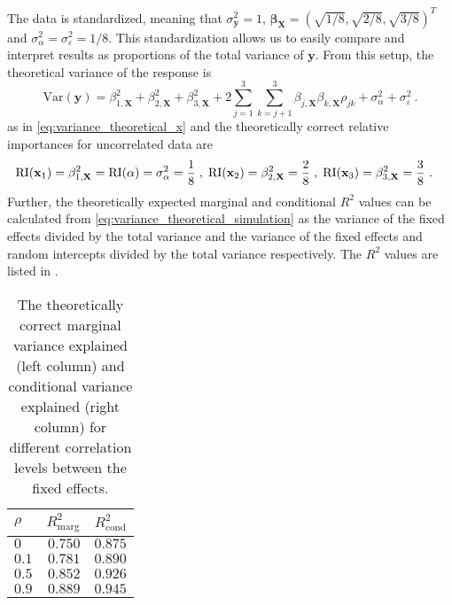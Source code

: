 The data is standardized, meaning that $\sigma^2_{\mathbf{y}}=1$, $\boldsymbol{\beta}_{\mathbf{X}}=(\sqrt{1/8}, \sqrt{2/8}, \sqrt{3/8})^T$ and $\sigma^2_{\alpha}=\sigma^2_{\varepsilon} = 1/8$.
This standardization allows us to easily compare and interpret results as proportions of the total variance of $\mathbf{y}$.
\newline
\newline
From this setup, the theoretical variance of the response is
\begin{equation}
    \label{eq:variance_theoretical_simulation}
    \text{Var}(\mathbf{y}) = \beta_{1, \mathbf{X}}^2 + \beta_{2, \mathbf{X}}^2 + \beta_{3, \mathbf{X}}^2 + 2\sum_{j=1}^{3}\sum_{k=j+1}^{3} \beta_{j, \mathbf{X}}\beta_{k, \mathbf{X}}\rho_{jk} + \sigma_{\alpha}^2 + \sigma^2_{\varepsilon} \ .
\end{equation}
as in \eqref{eq:variance_theoretical_x} and the theoretically correct relative importances for uncorrelated data are
\begin{equation}
    \begin{aligned}
        \text{RI}(\mathbf{x}_1) =  \beta_{1, \mathbf{X}}^2& = \text{RI}(\alpha) = \sigma^2_{\alpha} = \frac{1}{8} \hspace{1mm}, \hspace{1mm} \text{RI}(\mathbf{x}_2) = \beta_{2, \mathbf{X}}^2 = \frac{2}{8} \hspace{1mm}, \hspace{1mm} \text{RI}(\mathbf{x}_3) = \beta_{3, \mathbf{X}}^2 = \frac{3}{8} \ . 
    \end{aligned}
\end{equation}
Further, the theoretically expected marginal and conditional $R^2$ values can be calculated from \ref{eq:variance_theoretical_simulation} as the variance of the fixed effects divided by the total variance and the variance of the fixed effects and random intercepts divided by the total variance respectively. 
The $R^2$ values are listed in .
\begin{table}[ht]
    \centering
    \begin{tabular}{lrr}
    \hline
    $\rho$ & $R^2_{\text{marg}}$ & $R^2_{\text{cond}}$\\ 
    \hline
    $0$ & $0.750$ &  $0.875$ \\ 
    $0.1$ & $0.781$ & $0.890$ \\ 
    $0.5$ & $0.852$ & $0.926$\\ 
    $0.9$ & $0.889$ & $0.945$\\ 
    \hline
    \end{tabular}
    \caption{The theoretically correct marginal variance explained (left column) and conditional variance explained (right column) for different correlation levels between the fixed effects.}
    \label{table:1}
\end{table}
